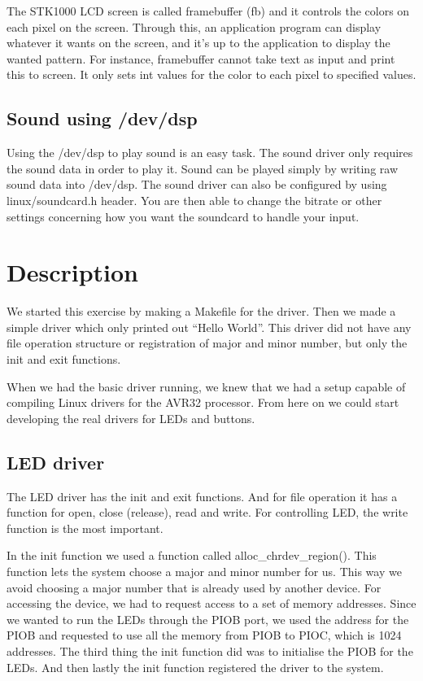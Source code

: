 \documentclass[12pt,a4paper,final]{report}
\numberwithin{equation}{section}
\numberwithin{table}{section}
\numberwithin{figure}{section}
\begin{document}
The STK1000 LCD screen is called framebuffer (fb) and it controls the colors on each pixel on the screen. Through this, an application program can display whatever it wants on the screen, and it’s up to the application to display the wanted pattern. For instance, framebuffer cannot take text as input and print this to screen. It only sets int values for the color to each pixel to specified values.

\subsection{Sound using /dev/dsp}
\label{sec:sounddsp}

Using the /dev/dsp to play sound is an easy task. The sound driver only requires the sound data in order to play it. Sound can be played simply by writing raw sound data into /dev/dsp. The sound driver can also be configured by using linux/soundcard.h header. You are then able to change the bitrate or other settings concerning how you want the soundcard to handle your input.

\newpage

\section{Description}
\label{sec:description}

We started this exercise by making a Makefile for the driver. Then we made a simple driver which only printed out “Hello World”. This driver did not have any file operation structure or registration of major and minor number, but only the init and exit functions.

When we had the basic driver running, we knew that we had a setup capable of compiling Linux drivers for the AVR32 processor. From here on we could start developing the real drivers for LEDs and buttons.

\subsection{LED driver}
\label{sec:leddriver}

The LED driver has the init and exit functions. And for file operation it has a function for open, close (release), read and write. For controlling LED, the write function is the most important.

In the init function we used a function called alloc\_chrdev\_region(). This function lets the system choose a major and minor number for us. This way we avoid choosing a major number that is already used by another device. For accessing the device, we had to request access to a set of memory addresses. Since we wanted to run the LEDs through the PIOB port, we used the address for the PIOB and requested to use all the memory from PIOB to PIOC, which is 1024 addresses.  The third thing the init function did was to initialise the PIOB for the LEDs. And then lastly the init function registered the driver to the system.
\end{document}
